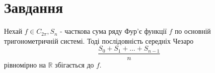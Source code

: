 
\chapter{Завдання \theHchapter}

\begin{tcolorbox}[title=Теорема Л.Фейєра]
    Нехай $f \in C_{2 \pi}, S_n$ - часткова сума ряду Фур'є функції $f$ по основній тригонометричній системі. Тоді послідовність середніх Чезаро
    $$
    \frac{S_0+S_1+\ldots+S_{n-1}}{n}
    $$
    рівномірно на $\mathbb{R}$ збігається до $f$.

\end{tcolorbox}


